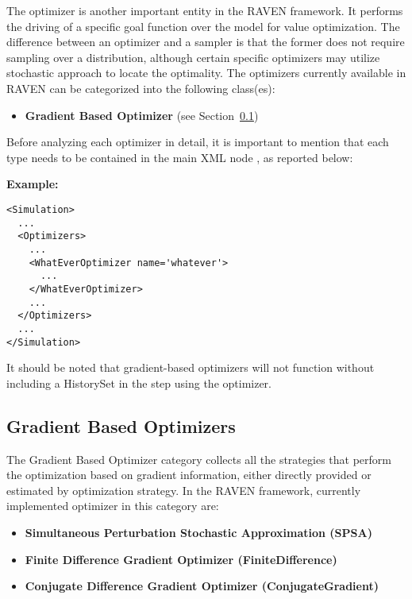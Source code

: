 
The optimizer is another important entity in the RAVEN framework. It performs the driving of a specific goal function
over the model for value optimization. The difference between an optimizer and a sampler is that the former does not require
 sampling over a distribution, although certain specific optimizers may utilize stochastic approach to locate the optimality.
The optimizers currently available in RAVEN can be categorized into the following class(es):
\begin{itemize}
\item \textbf{Gradient Based Optimizer} (see Section~\ref{subsec:gradientBasedOptimizers})
\end{itemize}

Before analyzing each optimizer in detail, it is important to mention that each type needs to be contained in the main XML
node , as reported below:

\textbf{Example:}

\begin{lstlisting}[style=XML]
<Simulation>
  ...
  <Optimizers>
    ...
    <WhatEverOptimizer name='whatever'>
      ...
    </WhatEverOptimizer>
    ...
  </Optimizers>
  ...
</Simulation>
\end{lstlisting}

It should be noted that gradient-based optimizers will not function without including a
 HistorySet in the  step using the optimizer.

\subsection{Gradient Based Optimizers}
\label{subsec:gradientBasedOptimizers}
The Gradient Based Optimizer category collects all the strategies that perform the optimization based on gradient information,
 either directly provided or estimated by optimization strategy. In the RAVEN framework, currently implemented optimizer in this
 category are:
\begin{itemize}
\item \textbf{Simultaneous Perturbation Stochastic Approximation (SPSA)}
\item \textbf{Finite Difference Gradient Optimizer (FiniteDifference)}
\item \textbf{Conjugate Difference Gradient Optimizer (ConjugateGradient)}

\end{itemize}

